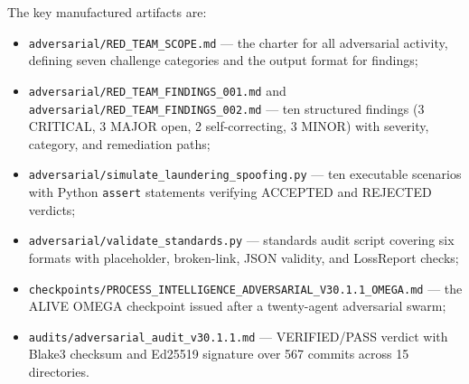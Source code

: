 The key manufactured artifacts are:
\begin{itemize}
  \item \texttt{adversarial/RED\_TEAM\_SCOPE.md} --- the charter for all adversarial activity,
        defining seven challenge categories and the output format for findings;
  \item \texttt{adversarial/RED\_TEAM\_FINDINGS\_001.md} and
        \texttt{adversarial/RED\_TEAM\_FINDINGS\_002.md} --- ten structured findings (3
        CRITICAL, 3 MAJOR open, 2 self-correcting, 3 MINOR) with severity, category, and
        remediation paths;
  \item \texttt{adversarial/simulate\_laundering\_spoofing.py} --- ten executable scenarios
        with Python \texttt{assert} statements verifying ACCEPTED and REJECTED verdicts;
  \item \texttt{adversarial/validate\_standards.py} --- standards audit script covering six
        formats with placeholder, broken-link, JSON validity, and LossReport checks;
  \item \texttt{checkpoints/PROCESS\_INTELLIGENCE\_ADVERSARIAL\_V30.1.1\_OMEGA.md} --- the
        ALIVE OMEGA checkpoint issued after a twenty-agent adversarial swarm;
  \item \texttt{audits/adversarial\_audit\_v30.1.1.md} --- VERIFIED/PASS verdict with Blake3
        checksum and Ed25519 signature over 567 commits across 15 directories.
\end{itemize}
